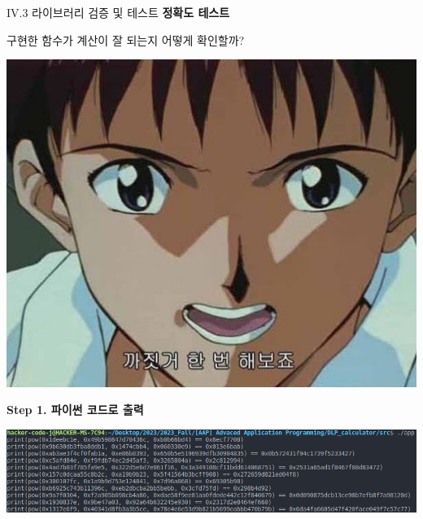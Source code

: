 \documentclass{beamer}
\begin{document}
\begin{frame}{IV.3 라이브러리 검증 및 테스트}
	\alert{\bf 정확도 테스트}\\
	\begin{flushleft}
		\begin{minipage}{.8\linewidth}
			구현한 함수가 계산이 잘 되는지 어떻게 확인할까?
		\end{minipage}
		\begin{minipage}{.15\linewidth}
			\includegraphics[scale=.15]{lib3.jpg}
		\end{minipage}
	\end{flushleft}
	
	\alert{\bf Step 1. 파이썬 코드로 출력}\\
	\begin{center}
		\includegraphics[width=\linewidth]{lib4.png}
	\end{center}
\end{frame}
\end{document}

